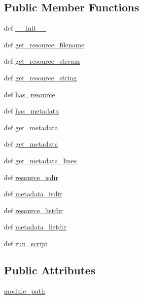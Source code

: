 \subsection*{Public Member Functions}
\begin{DoxyCompactItemize}
\item 
def \hyperlink{classpkg__resources_1_1NullProvider_a79aa0318a626810051696a49408d3b3b}{\+\_\+\+\_\+init\+\_\+\+\_\+}
\item 
def \hyperlink{classpkg__resources_1_1NullProvider_ace50ccdaa48a54b28a334de9f996bf46}{get\+\_\+resource\+\_\+filename}
\item 
def \hyperlink{classpkg__resources_1_1NullProvider_a3daaed408a0fbc9c0e80ab0a77d88c9e}{get\+\_\+resource\+\_\+stream}
\item 
def \hyperlink{classpkg__resources_1_1NullProvider_a486fdeea685113cd038b2cc5856ac3cb}{get\+\_\+resource\+\_\+string}
\item 
def \hyperlink{classpkg__resources_1_1NullProvider_ae73f7a19e1f35bfb0c941390ca4dbecd}{has\+\_\+resource}
\item 
def \hyperlink{classpkg__resources_1_1NullProvider_a255d417db73654b5e36cf7de6b6da88d}{has\+\_\+metadata}
\item 
def \hyperlink{classpkg__resources_1_1NullProvider_afb3e9437f012af2a7875e9beb64392e7}{get\+\_\+metadata}
\item 
def \hyperlink{classpkg__resources_1_1NullProvider_afb3e9437f012af2a7875e9beb64392e7}{get\+\_\+metadata}
\item 
def \hyperlink{classpkg__resources_1_1NullProvider_a2eb57a59fcee7b674429dacb44f374cb}{get\+\_\+metadata\+\_\+lines}
\item 
def \hyperlink{classpkg__resources_1_1NullProvider_a8e886752a4ca59342ba5205bb416cc2f}{resource\+\_\+isdir}
\item 
def \hyperlink{classpkg__resources_1_1NullProvider_a388979fb4a3e8b7da779eab8a79b387a}{metadata\+\_\+isdir}
\item 
def \hyperlink{classpkg__resources_1_1NullProvider_adf3299c69596a1c755c2d26e5611c556}{resource\+\_\+listdir}
\item 
def \hyperlink{classpkg__resources_1_1NullProvider_a9447938fad02800adf407a16f998130d}{metadata\+\_\+listdir}
\item 
def \hyperlink{classpkg__resources_1_1NullProvider_a2a20f511f586c15734cca235f7259c48}{run\+\_\+script}
\end{DoxyCompactItemize}
\subsection*{Public Attributes}
\begin{DoxyCompactItemize}
\item 
\hyperlink{classpkg__resources_1_1NullProvider_a90c7b6ef27446c70d03cb2b634b31e97}{module\+\_\+path}
\end{DoxyCompactItemize}
